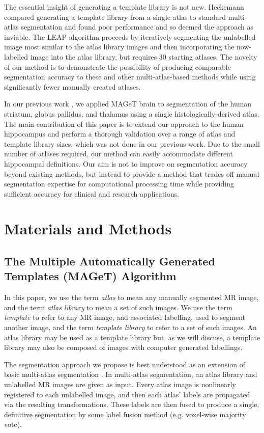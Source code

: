 \documentclass{article}\usepackage{graphicx, color}
\begin{document}
The essential insight of generating a template library is not new.  Heckemann
\citep{Heckemann2006} compared generating a template library from a single atlas
to standard multi-atlas segmentation and found poor performance and so deemed
the approach as inviable.  The LEAP algorithm \citep{Wolz2010} proceeds by
iteratively segmenting the unlabelled image most similar to the atlas library
images and then incorporating the now-labelled image into the atlas library,
but requires 30 starting atlases.  The novelty of our method is to demonstrate
the possibility of producing comparable segmentation accuracy to these and
other multi-atlas-based methods while using significantly fewer manually
created atlases.

In our previous work \citep{Chakravarty2012}, we applied MAGeT brain to
segmentation of the human striatum, globus pallidus, and thalamus using a
single histologically-derived atlas. The main contribution of this paper is to
extend our approach to the human hippocampus and perform a thorough validation
over a range of atlas and template library sizes, which was not done in our
previous work.  Due to the small number of atlases required, our method can
easily accommodate different hippocampal definitions. Our aim is not to improve
on segmentation accuracy beyond existing methods, but instead to provide a
method that trades off manual segmentation expertise for computational
processing time while providing sufficient accuracy for clinical and research
applications.


\section{Materials and Methods} 
\subsection{The Multiple Automatically Generated Templates (MAGeT) Algorithm}

In this paper, we use the term {\it atlas} to mean any manually segmented MR
image, and the term {\it atlas library} to mean a set of such images.  We use
the term {\it template} to refer to any MR image, and associated labelling,
used to segment another image, and the term {\it template library} to refer to
a set of such images.  An atlas library may be used as a template library but,
as we will discuss, a template library may also be composed of images with
computer generated labellings. 

The segmentation approach we propose is best understood as an extension of
basic multi-atlas segmentation \citep{Collins2010}.  In multi-atlas segmentation,
an atlas library and unlabelled MR images are given as input.  Every atlas
image is nonlinearly registered to each unlabelled image, and then each atlas'
labels are propagated via the resulting transformations.  These labels are then
fused to produce a single, definitive segmentation by some label fusion method
(e.g.  voxel-wise majority vote). 
\end{document}
